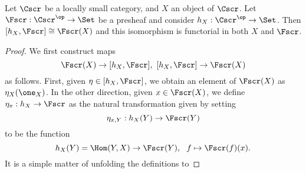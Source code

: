 \begin{theorem}
  Let $\Cscr$ be a locally small category, and $X$ an object of $\Cscr$.
  Let $\Fscr : \Cscr^{\op} \to \Set$ be a presheaf and consider $h_{X} : \Cscr^{\op} \to \Set$.
  Then $[h_{X},\Fscr] \cong \Fscr(X)$ and this isomorphism is functorial in both $X$ and $\Fscr$.
\end{theorem}
\begin{proof}
  We first construct maps
  \[ \Fscr(X) \to [h_{X},\Fscr], \ [h_{X},\Fscr] \to \Fscr(X) \]
  as follows.
  First, given $\eta \in [h_{X},\Fscr]$, we obtain an element of $\Fscr(X)$ as $\eta_{X}(\one_{X})$.
  In the other direction, given $x \in \Fscr(X)$, we define $\eta_{x} : h_{X} \to \Fscr$ as the natural transformation given by setting
  \[ \eta_{x,Y} : h_{X}(Y) \to \Fscr(Y) \]
  to be the function
  \[ h_{X}(Y) = \Hom(Y,X) \to \Fscr(Y), \ \ f \mapsto \Fscr(f)(x). \]
  It is a simple matter of unfolding the definitions to 
\end{proof}



